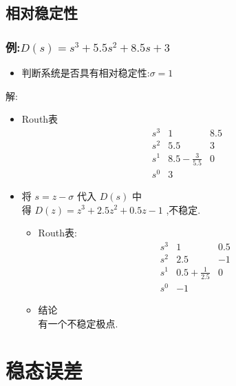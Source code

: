 \documentclass{article}
\begin{document}
\subsection{相对稳定性}
\label{sec-2-6}
\begin{frame}
\frametitle{例:$D(s)=s^{3}+5.5s^{2}+8.5s+3$}
\label{sec-2-6-1}

\begin{itemize}
\item 判断系统是否具有相对稳定性:$\sigma=1$
\end{itemize}

解:
\begin{itemize}

\item Routh表\\
\label{sec-2-6-1-1}%
\[
\begin{matrix}
s^{3} & 1 &  8.5 \\
s^{2} & 5.5  & 3 \\
s^{1} & 8.5-\frac{3}{5.5} & 0 \\
s^{0} & 3
\end{matrix}
\]


\item 将 $s=z-\sigma$ 代入 $D(s)$ 中\\
\label{sec-2-6-1-2}%
得 $D(z)=z^{3}+2.5z^{2}+0.5z-1$ ,不稳定.

\begin{itemize}

\item Routh表:\\
\label{sec-2-6-1-2-1}%
\[
\begin{matrix}
s^{3} & 1 &  0.5 \\
s^{2} & 2.5  & -1 \\
s^{1} & 0.5+\frac{1}{2.5} & 0 \\
s^{0} & -1
\end{matrix}
\]


\item 结论\\
\label{sec-2-6-1-2-2}%
有一个不稳定极点.


\end{itemize} %
\end{itemize} %
\end{frame}
\section{稳态误差}
\label{sec-3}
\end{document}
